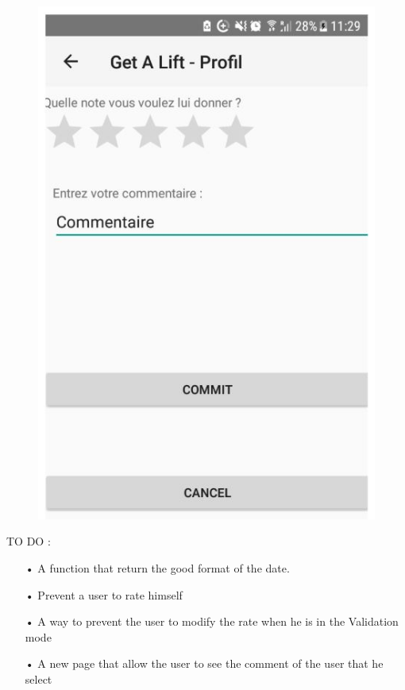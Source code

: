 \begin{figure}[H]
\begin{center}
\includegraphics[scale = 0.7]{diagrams/rating_page.JPG} 
\end{center}
\end{figure}
TO DO : \\
\begin{enumerate}
\item[•] A function that return the good format of the date.
\item[•] Prevent a user to rate himself 
\item[•] A way to prevent the user to modify the rate when he is in the Validation mode 
\item[•] A new page that allow the user to see the comment of the user that he select
\end{enumerate} 



